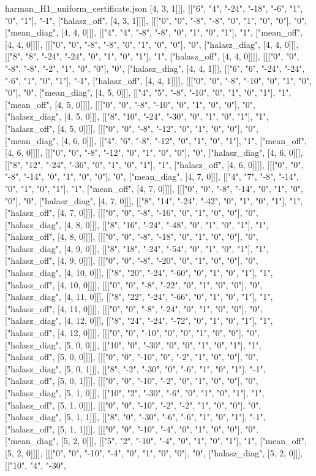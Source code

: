 \begin{filecontents*}[overwrite]{harman_H1_uniform_certificate.json}
[4, 3, 1]]], [["6", "4", "-24", "-18", "-6", "1", "0", "1"], "-1", ["halasz_off", [4, 3, 1]]]], [[["0", "0", "-8", "-8", "0", "1", "0", "0"], "0", ["mean_diag", [4, 4, 0]]], [["4", "4", "-8", "-8", "0", "1", "0", "1"], "1", ["mean_off", [4, 4, 0]]]], [[["0", "0", "-8", "-8", "0", "1", "0", "0"], "0", ["halasz_diag", [4, 4, 0]]], [["8", "8", "-24", "-24", "0", "1", "0", "1"], "1", ["halasz_off", [4, 4, 0]]]], [[["0", "0", "-8", "-8", "-2", "1", "0", "0"], "0", ["halasz_diag", [4, 4, 1]]], [["6", "6", "-24", "-24", "-6", "1", "0", "1"], "-1", ["halasz_off", [4, 4, 1]]]], [[["0", "0", "-8", "-10", "0", "1", "0", "0"], "0", ["mean_diag", [4, 5, 0]]], [["4", "5", "-8", "-10", "0", "1", "0", "1"], "1", ["mean_off", [4, 5, 0]]]], [[["0", "0", "-8", "-10", "0", "1", "0", "0"], "0", ["halasz_diag", [4, 5, 0]]], [["8", "10", "-24", "-30", "0", "1", "0", "1"], "1", ["halasz_off", [4, 5, 0]]]], [[["0", "0", "-8", "-12", "0", "1", "0", "0"], "0", ["mean_diag", [4, 6, 0]]], [["4", "6", "-8", "-12", "0", "1", "0", "1"], "1", ["mean_off", [4, 6, 0]]]], [[["0", "0", "-8", "-12", "0", "1", "0", "0"], "0", ["halasz_diag", [4, 6, 0]]], [["8", "12", "-24", "-36", "0", "1", "0", "1"], "1", ["halasz_off", [4, 6, 0]]]], [[["0", "0", "-8", "-14", "0", "1", "0", "0"], "0", ["mean_diag", [4, 7, 0]]], [["4", "7", "-8", "-14", "0", "1", "0", "1"], "1", ["mean_off", [4, 7, 0]]]], [[["0", "0", "-8", "-14", "0", "1", "0", "0"], "0", ["halasz_diag", [4, 7, 0]]], [["8", "14", "-24", "-42", "0", "1", "0", "1"], "1", ["halasz_off", [4, 7, 0]]]], [[["0", "0", "-8", "-16", "0", "1", "0", "0"], "0", ["halasz_diag", [4, 8, 0]]], [["8", "16", "-24", "-48", "0", "1", "0", "1"], "1", ["halasz_off", [4, 8, 0]]]], [[["0", "0", "-8", "-18", "0", "1", "0", "0"], "0", ["halasz_diag", [4, 9, 0]]], [["8", "18", "-24", "-54", "0", "1", "0", "1"], "1", ["halasz_off", [4, 9, 0]]]], [[["0", "0", "-8", "-20", "0", "1", "0", "0"], "0", ["halasz_diag", [4, 10, 0]]], [["8", "20", "-24", "-60", "0", "1", "0", "1"], "1", ["halasz_off", [4, 10, 0]]]], [[["0", "0", "-8", "-22", "0", "1", "0", "0"], "0", ["halasz_diag", [4, 11, 0]]], [["8", "22", "-24", "-66", "0", "1", "0", "1"], "1", ["halasz_off", [4, 11, 0]]]], [[["0", "0", "-8", "-24", "0", "1", "0", "0"], "0", ["halasz_diag", [4, 12, 0]]], [["8", "24", "-24", "-72", "0", "1", "0", "1"], "1", ["halasz_off", [4, 12, 0]]]], [[["0", "0", "-10", "0", "0", "1", "0", "0"], "0", ["halasz_diag", [5, 0, 0]]], [["10", "0", "-30", "0", "0", "1", "0", "1"], "1", ["halasz_off", [5, 0, 0]]]], [[["0", "0", "-10", "0", "-2", "1", "0", "0"], "0", ["halasz_diag", [5, 0, 1]]], [["8", "-2", "-30", "0", "-6", "1", "0", "1"], "-1", ["halasz_off", [5, 0, 1]]]], [[["0", "0", "-10", "-2", "0", "1", "0", "0"], "0", ["halasz_diag", [5, 1, 0]]], [["10", "2", "-30", "-6", "0", "1", "0", "1"], "1", ["halasz_off", [5, 1, 0]]]], [[["0", "0", "-10", "-2", "-2", "1", "0", "0"], "0", ["halasz_diag", [5, 1, 1]]], [["8", "0", "-30", "-6", "-6", "1", "0", "1"], "-1", ["halasz_off", [5, 1, 1]]]], [[["0", "0", "-10", "-4", "0", "1", "0", "0"], "0", ["mean_diag", [5, 2, 0]]], [["5", "2", "-10", "-4", "0", "1", "0", "1"], "1", ["mean_off", [5, 2, 0]]]], [[["0", "0", "-10", "-4", "0", "1", "0", "0"], "0", ["halasz_diag", [5, 2, 0]]], [["10", "4", "-30", 
\end{filecontents*}

